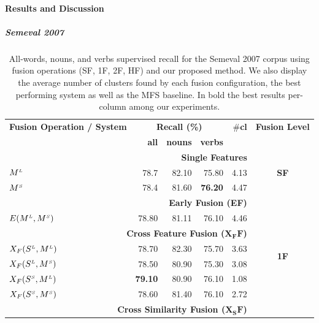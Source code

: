 \paragraph{Results and Discussion}
\subparagraph{Semeval 2007}



\begin{table}[htp!]
\centering
\caption{All-words, nouns, and verbs supervised recall for the Semeval 2007 corpus using fusion operations (SF, 1F, 2F, HF) and our proposed method. We also display the average number of clusters found by each fusion configuration, the best performing system as well as the MFS baseline. In bold the best results per-column among our experiments.}
\label{tab:wsd-semeval_sup_Recall}
\begin{tabular}{@{}lrrrrc@{}}
\toprule
\textbf{Fusion Operation / System} & \multicolumn{3}{c}{\textbf{Recall (\%)}} & \#\textbf{cl} & \textbf{Fusion Level}\\ 
        & \textbf{all}          & \textbf{nouns}          & \textbf{verbs} &          \\ 
       \midrule
        \multicolumn{5}{r}{\textbf{Single Features}} & \multirow{3}{*}{\textbf{SF}} \\ %
       $M^{\scriptscriptstyle L}$                    & 78.7 & 82.10 & 75.80 & 4.13\\
 

       $M^{\scriptscriptstyle S}$                    & 78.4 & 81.60 & \textbf{76.20} & 4.47\\
       \midrule
                   \multicolumn{5}{r}{\textbf{Early Fusion (EF)}}  & \multirow{10}{*}{\textbf{1F}}     \\ %
       $E(M^{\scriptscriptstyle L}, M^{\scriptscriptstyle S})$		& 78.80 & 81.11 & 76.10 & 4.46\\
                   \multicolumn{5}{r}{\textbf{Cross Feature Fusion ($\mathbf{X_FF}$)}}       \\ %
	   
	   $X_F(S^{\scriptscriptstyle L}, M^{\scriptscriptstyle L})$		& 78.70 & 82.30 & 75.70  & 3.63\\	   
       $X_F(S^{\scriptscriptstyle L}, M^{\scriptscriptstyle S})$		& 78.50 & 80.90 & 75.30  & 3.08\\
	   $X_F(S^{\scriptscriptstyle S}, M^{\scriptscriptstyle L})$		& \textbf{79.10} & 80.90 & 76.10  & 1.08\\	   
       $X_F(S^{\scriptscriptstyle S}, M^{\scriptscriptstyle S})$		& 78.60 & 81.40 & 76.10 & 2.72\\       
                   \multicolumn{5}{r}{\textbf{Cross Similarity Fusion ($\mathbf{X_SF}$)}}       \\ %
	   

\end{tabular}
\end{table}
